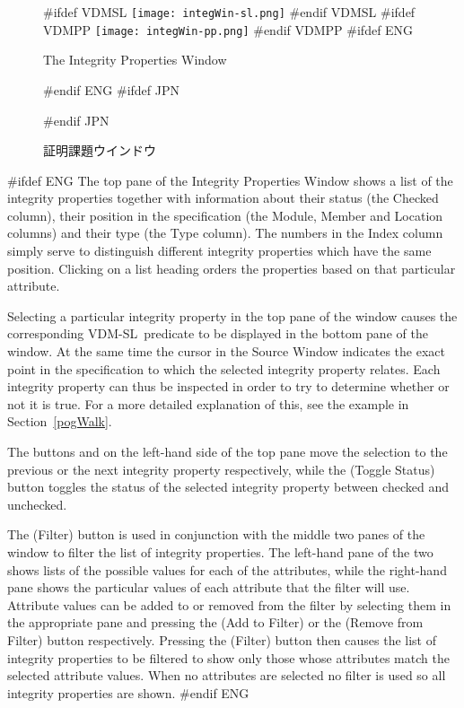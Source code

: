 \documentclass[\pformat,12pt]{article}
\newcommand{\vdmslpp}{VDM-SL}
\newcommand{\vdmslpp}{VDM++}
\newcommand{\guicmd}[1]{{\sf #1}}
\newcommand{\guicmd}[1]{{\gt #1}}
\begin{document}
\begin{figure}[tbh]
\begin{center}
#ifdef VDMSL
\texttt{[image: integWin-sl.png]}
#endif VDMSL
#ifdef VDMPP
\texttt{[image: integWin-pp.png]}
#endif VDMPP
#ifdef ENG
\caption{The Integrity Properties Window}
#endif ENG
#ifdef JPN
\caption{証明課題ウインドウ}
#endif JPN
\label{fig:integWin2}
\end{center}
\end{figure}

#ifdef ENG
The top pane of the \guicmd{Integrity Properties Window} shows a list
of the integrity properties together with information about their
status (the \guicmd{Checked} column), their position in the
specification (the \guicmd{Module}, \guicmd{Member} and
\guicmd{Location} columns) and 
their type (the \guicmd{Type} column). The numbers in the
\guicmd{Index} column simply serve to distinguish different integrity
properties which have the same position. Clicking on a list heading
orders the properties based on that particular attribute.

Selecting a particular integrity property in the top pane of the
window causes the corresponding \vdmslpp\ predicate to be displayed in
the bottom pane of the window. At the same time the cursor in the
\guicmd{Source Window} indicates the exact point in the specification to
which the selected integrity property relates. Each integrity property
can thus be inspected in order to try to determine whether or not it
is true. For a more detailed explanation of this, see the example in
Section~\ref{pogWalk}.

The buttons 
 and
 on the
left-hand side of the top pane move the selection to the previous or
the next integrity property respectively, while the 
(\guicmd{Toggle Status}) button toggles the status of the selected
integrity property between checked and unchecked.

The
(\guicmd{Filter}) button is used in conjunction with the middle two
panes of the window to filter the list of integrity properties. The
left-hand pane of the two shows lists of the possible values for each
of 
the attributes, while the right-hand pane shows the particular values
of each attribute that the filter will use. Attribute values can be
added to or removed from the filter by selecting them in the
appropriate pane and pressing the 
(\guicmd{Add to Filter}) or the 
(\guicmd{Remove from Filter}) button respectively. Pressing the 
(\guicmd{Filter}) button then causes the list of integrity properties
to be filtered to show only those whose attributes match the selected
attribute values. When no attributes are selected no filter is used so
all integrity properties are shown.
#endif ENG
\end{document}
